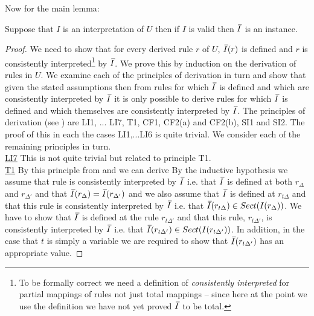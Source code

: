 Now for the main lemma:
\begin{lemma}
Suppose that $I$ is an interpretation of $U$  then if $I$ is valid  then $\Ibar$ is an instance.
\end{lemma}
\begin{proof} 
\newcommand {\forceSOURCEwidth}{\rule{5cm}{0pt}}  %
\newcommand {\forceTARGETwidth}{\rule{2.2cm}{0pt}}
We need to show that for every derived rule $r$ of $U$, $\Ibar(r)$ is defined and $r$ is consistently interpreted\footnote{To be formally correct we need a definition of \textit{consistently interpreted} for partial mappings of rules not just total mappings -- since here at the point we use the definition we have not yet proved $\Ibar$ to be total.} by $\Ibar$. 
We prove this by induction on the derivation of rules in $U$. We examine each of the principles of derivation in turn
and show that given the stated assumptions then from rules for which $\Ibar$ is defined and which are consistently interpreted by $\Ibar$ 
it is only possible to derive rules for which $\Ibar$ is defined and which themselves are consistently interpreted by $\Ibar$.
The principles of derivation (see \cite{Cartmell86}) are LI1, ... LI7, T1, CF1, CF2(a) and CF2(b), SI1 and SI2. 
The proof of this  in each the cases  LI1,...LI6 is quite trivial. We consider each of the remaining principles in turn. 
 \\
\underline{LI7} This is not quite trivial but related to principle T1.  \\


\underline{T1}
By this principle from  and  we can derive 
By the inductive hypothesis we assume that rule   is consistently interpreted by $\Ibar$ i.e. that
$\Ibar$ is defined at both $r_\Delta$ and $r_{\Delta'}$  and that $\Ibar(r_\Delta) = \Ibar(r_{\Delta'})$
and we also assume that $\Ibar$ is defined at $r_{t\Delta}$ and that this rule
is consistently interpreted by $\Ibar$ i.e. that $\Ibar(r_{t\Delta}) \in Sect(I(r_{\Delta}))$.
We have to show that $\Ibar$ is defined at the rule $r_{t\Delta'}$ and that this rule, $r_{t\Delta'}$, is consistently interpreted 
by $\Ibar$ i.e. that $\Ibar(r_{t\Delta'}) \in Sect(I(r_{t\Delta'}))$. 
In addition, in the case that  $t$ is simply a variable we are required to show  that $\Ibar(r_{t\Delta'})$ has an appropriate value.


\end{proof}
